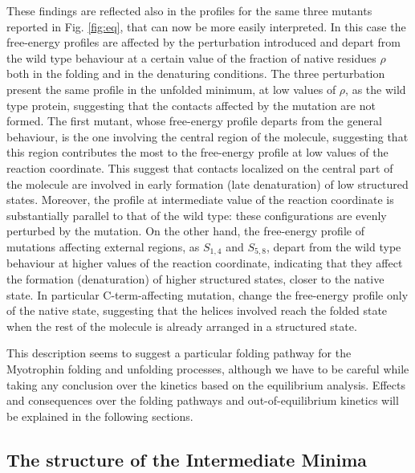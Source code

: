 These findings are reflected also in the profiles for the same three mutants
reported in Fig. \ref{fig:eq}, that can now be more easily interpreted.
In this case the free-energy profiles are affected by the perturbation
introduced and depart from the wild type behaviour at a certain value of the
fraction of native residues $\rho$ both in the folding and in the denaturing
conditions.
The three perturbation present the same profile in the
unfolded minimum, at low values of $\rho$, as the wild type protein, suggesting
that the contacts affected by the mutation are not formed.
The first mutant, whose free-energy profile departs from the general behaviour,
is the one involving the central region of the molecule, 
suggesting that this region
contributes the most to the free-energy profile at low values of the reaction
coordinate.
This suggest that contacts localized on the central part of the
molecule are involved in early formation (late denaturation) of low structured
states. 
Moreover, the profile at intermediate value of the reaction
coordinate is substantially parallel to that of the wild type: these
configurations are evenly perturbed by the mutation. 
On the other hand, the free-energy profile of mutations affecting external
regions, as $S_{1,4}$ and $S_{5,8}$, depart from the wild type behaviour at
higher values of the reaction coordinate, indicating that they affect the formation
(denaturation) of higher structured states, closer to the native state.
In particular C-term-affecting mutation, change the free-energy profile only of the
native state, suggesting that the helices involved reach the folded state when
the rest of the molecule is already arranged in a structured state.

This description seems to suggest a particular folding pathway for the Myotrophin
folding and unfolding processes, although we have to be careful while taking
any conclusion over the kinetics based on the equilibrium analysis.
Effects and consequences over the folding pathways and out-of-equilibrium
kinetics will be explained in the following sections.


\subsection{The structure of the Intermediate Minima}
\label{subsec:inter}

